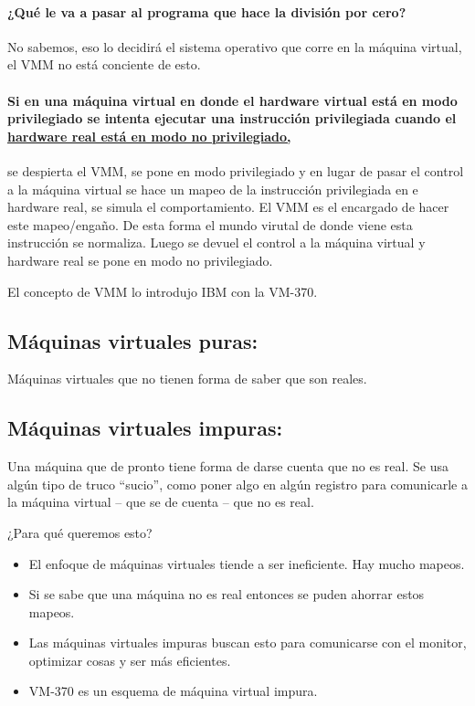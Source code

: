 \documentclass[12pt, times]{simauth}
\begin{document}
\paragraph{¿Qué le va a pasar al programa que hace la división por cero?} No sabemos, eso lo decidirá el sistema operativo que corre en la máquina virtual, el VMM no está conciente de esto.

\paragraph{Si en una máquina virtual en donde el hardware virtual está en modo privilegiado se intenta ejecutar una instrucción privilegiada cuando el \underline{hardware real está en modo no privilegiado,}}se despierta el VMM, se pone en modo privilegiado y en lugar de pasar el control a la máquina virtual se hace un mapeo de la instrucción privilegiada en e hardware real, se simula el comportamiento. El VMM es el encargado de hacer este mapeo/engaño. De esta forma el mundo virutal de donde viene esta instrucción se normaliza. Luego se devuel el control a la máquina virtual y hardware real se pone en modo no privilegiado.

El concepto de VMM lo introdujo IBM con la VM-370.

\subsection{Máquinas virtuales puras:} Máquinas virtuales que no tienen forma de saber que son reales.

\subsection{Máquinas virtuales impuras:} Una máquina que de pronto tiene forma de darse cuenta que no es real. Se usa algún tipo de truco ``sucio'', como poner algo en algún registro para comunicarle a la máquina virtual -- que se de cuenta -- que no es real.

¿Para qué queremos esto? 
    \begin{itemize}
        \item El enfoque de máquinas virtuales tiende a ser ineficiente. Hay mucho mapeos.
        \item Si se sabe que una máquina no es real entonces se puden ahorrar estos mapeos.
        \item Las máquinas virtuales impuras buscan esto para comunicarse con el monitor, optimizar cosas y ser más eficientes.
        \item VM-370 es un esquema de máquina virtual impura.
    \end{itemize}
    
\end{document}
